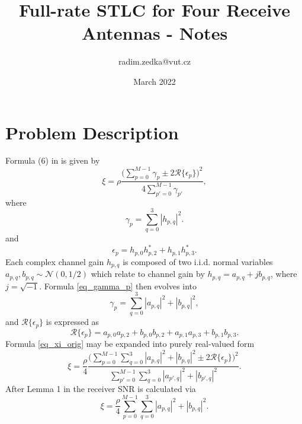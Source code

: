 \documentclass{article}
\begin{document}
\newcommand{\diag}{\operatorname{diag}}
\newcommand{\E}{\operatorname{E}} %
\newcommand{\tr}{\operatorname{tr}} %
\newcommand{\iDFT}{\operatorname{IDFT}} %
\newcommand{\DFT}{\operatorname{DFT}} %
\newcommand{\iFFT}{\operatorname{IFFT}} %
\newcommand{\iSFFT}{\operatorname{ISFFT}} %
\newcommand{\SFFT}{\operatorname{SFFT}} %
\newcommand{\FFT}{\operatorname{FFT}} %
\newcommand{\suma}{\operatorname{sum}} %

\title{Full-rate STLC for Four Receive Antennas - Notes }
\author{radim.zedka@vut.cz }
\date{March 2022}
\maketitle


\section{Problem Description}

Formula (6) in \cite{b_FullRate_STLC} is given by
\begin{equation} \label{eq_xi_orig}
    \xi = \rho \frac{\Big( \sum_{p=0}^{M-1} \gamma_{p} \pm 2\mathcal{R}\big\{ \epsilon_p\big\} \Big)^2}{4\sum_{p'=0}^{M-1}\gamma_{p'}},
\end{equation}
where 
\begin{equation} \label{eq_gamma_p}
    \gamma_p = \sum_{q=0}^{3} |h_{p,q}|^2.
\end{equation}
and
\begin{equation} \label{eq_epsilon_p}
    \epsilon_p = h_{p,0}h_{p,2}^* + h_{p,1}h_{p,3}^*.
\end{equation}
Each complex channel gain $h_{p,q}$ is composed of two i.i.d. normal variables $a_{p,q}, b_{p,q} \sim \mathcal{N}(0,1/2)$ which relate to channel gain by $h_{p,q} = a_{p,q} + jb_{p,q}$, where $j = \sqrt{-1}$.
Formula \eqref{eq_gamma_p} then evolves into
\begin{equation} \label{eq_gamma_p_2}
    \gamma_p = \sum_{q=0}^{3} |a_{p,q}|^2 + |b_{p,q}|^2,
\end{equation}
and $\mathcal{R}\big\{ \epsilon_p\big\}$ is expressed as
\begin{equation} \label{eq_epsilon_p_2}
    \mathcal{R}\big\{ \epsilon_p\big\} = a_{p,0}a_{p,2} + b_{p,0}b_{p,2} + a_{p,1}a_{p,3} + b_{p,1}b_{p,3}.
\end{equation}
Formula \eqref{eq_xi_orig} may be expanded into purely real-valued form
\begin{equation} \label{eq_xi_2}
    \xi = \frac{\rho}{4} \frac{\Big( \sum_{p=0}^{M-1} \sum_{q=0}^{3} |a_{p,q}|^2 + |b_{p,q}|^2 \pm 2\mathcal{R}\big\{ \epsilon_p\big\} \Big)^2}{ \sum_{p'=0}^{M-1} \sum_{q=0}^{3} |a_{p',q}|^2 + |b_{p',q}|^2}.
\end{equation}
After Lemma 1 in \cite{b_FullRate_STLC} the receiver SNR is calculated via
\begin{equation} \label{eq_xi_Lemma}
    \xi =  \frac{\rho}{4} \sum_{p=0}^{M-1} \sum_{q=0}^{3} |a_{p,q}|^2 + |b_{p,q}|^2 .
\end{equation}
\end{document}
